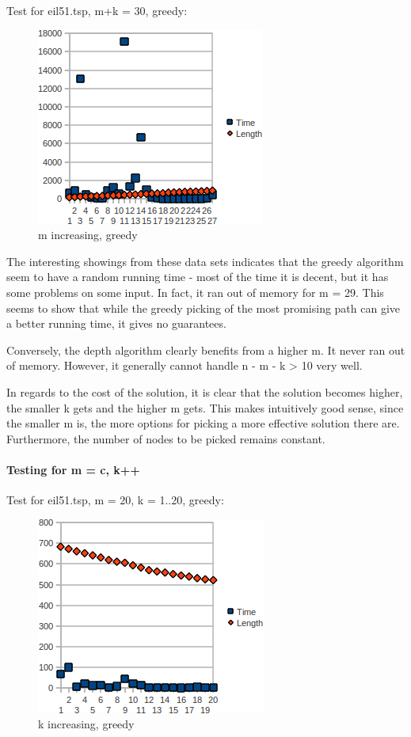Test for eil51.tsp, m+k = 30, greedy:

\begin{figure}[h!]
  \caption[Eil51, greedy, m+k=30]{m increasing, greedy}
  \centering
    \includegraphics[scale=1.0]{image_2.png}
\end{figure}

The interesting showings from these data sets indicates that the greedy
algorithm seem to have a random running time - most of the time it is decent,
but it has some problems on some input. In fact, it ran out of memory for
m = 29. This seems to show that while the greedy picking of the most promising
path can give a better running time, it gives no guarantees.

Conversely, the depth algorithm clearly benefits from a higher m. It never ran out
of memory. However, it generally cannot handle n - m - k > 10 very well.

In regards to the cost of the solution, it is clear that the solution becomes higher,
the smaller k gets and the higher m gets. This makes intuitively good sense, since
the smaller m is, the more options for picking a more effective solution there are.
Furthermore, the number of nodes to be picked remains constant.

\paragraph{Testing for m = c, k++}

Test for eil51.tsp, m = 20, k = 1..20, greedy:

\begin{figure}[h!]
  \caption[Eil51, greedy]{k increasing, greedy}
  \centering
    \includegraphics[scale=1.0]{image_3.png}
\end{figure}

